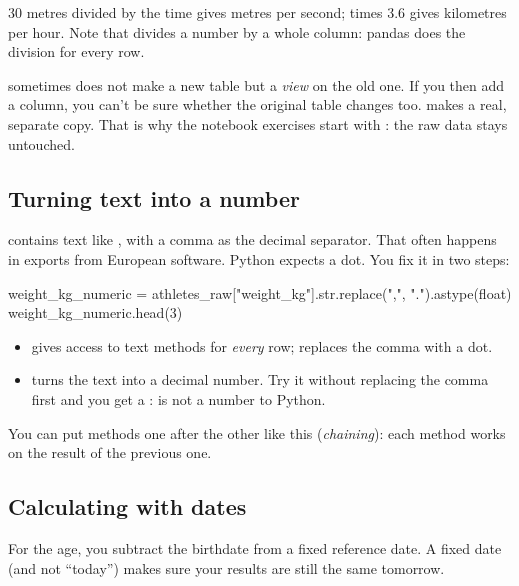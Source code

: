 \documentclass[11pt,a4paper]{article}
\begin{document}
30 metres divided by the time gives metres per second; times 3.6 gives
kilometres per hour. Note that 
divides a number by a whole column: pandas does the division for every
row.

\begin{watchout}
 sometimes does not make a new table but a
\emph{view} on the old one. If you then add a column, you can't be sure
whether the original table changes too.  makes a real,
separate copy. That is why the notebook exercises start with
: the raw data stays untouched.
\end{watchout}

\subsection{Turning text into a number}

 contains text like , with a comma as the
decimal separator. That often happens in exports from European
software. Python expects a dot. You fix it in two steps:

\begin{python}
weight_kg_numeric = athletes_raw["weight_kg"].str.replace(",", ".").astype(float)
weight_kg_numeric.head(3)
\end{python}

\begin{itemize}
  \item {} gives access to text methods for \emph{every} row;
         replaces the comma with a dot.
  \item {} turns the text into a decimal number. Try
        it without replacing the comma first and you get a
        :  is not a number to Python.
\end{itemize}

You can put methods one after the other like this (\emph{chaining}):
each method works on the result of the previous one.

\subsection{Calculating with dates}

For the age, you subtract the birthdate from a fixed reference date. A
fixed date (and not ``today'') makes sure your results are still the
same tomorrow.
\end{document}
